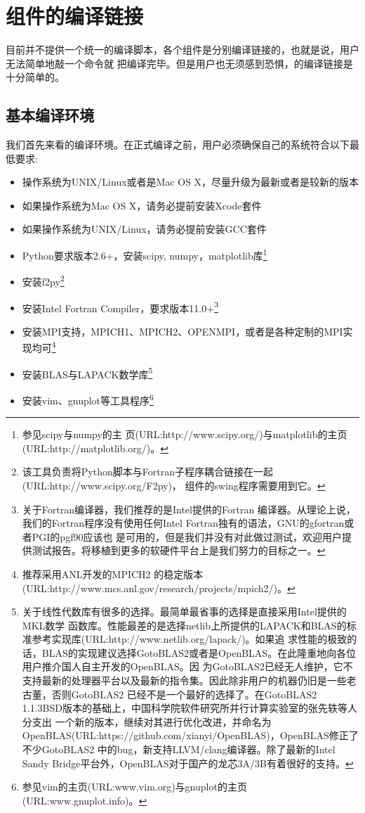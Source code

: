 \section{{\iqist}组件的编译链接}
\label{sec:compile}

{\iqist}目前并不提供一个统一的编译脚本，各个组件是分别编译链接的，也就是说，用户无法简单地敲一个命令就
把{\iqist}编译完毕。但是用户也无须感到恐惧，{\iqist}的编译链接是十分简单的。

\subsection{基本编译环境}

我们首先来看{\iqist}的编译环境。在正式编译{\iqist}之前，用户必须确保自己的系统符合以下最低要求:
\begin{itemize}
\item 操作系统为UNIX/Linux或者是Mac OS X，尽量升级为最新或者是较新的版本
\item 如果操作系统为Mac OS X，请务必提前安装Xcode套件
\item 如果操作系统为UNIX/Linux，请务必提前安装GCC套件
\item Python要求版本2.6+，安装scipy, numpy，matplotlib库\footnote{参见scipy与numpy的主
页(URL:http://www.scipy.org/)与matplotlib的主页(URL:http://matplotlib.org/)。}
\item 安装f2py\footnote{该工具负责将Python脚本与Fortran子程序耦合链接在一起(URL:http://www.scipy.org/F2py)，
{\hibiscus}组件的swing程序需要用到它。}
\item 安装Intel Fortran Compiler，要求版本11.0+\footnote{关于Fortran编译器，我们推荐的是Intel提供的Fortran
编译器。从理论上说，我们的Fortran程序没有使用任何Intel Fortran独有的语法，GNU的gfortran或者PGI的pgf90应该也
是可用的，但是我们并没有对此做过测试，欢迎用户提供测试报告。将{\iqist}移植到更多的软硬件平台上是我们努力的目标之一。}
\item 安装MPI支持，MPICH1、MPICH2、OPENMPI，或者是各种定制的MPI实现均可\footnote{推荐采用ANL开发的MPICH2
的稳定版本(URL:http://www.mcs.anl.gov/research/projects/mpich2/)。}
\item 安装BLAS与LAPACK数学库\footnote{关于线性代数库有很多的选择。最简单最省事的选择是直接采用Intel提供的MKL数学
函数库。性能最差的是选择netlib上所提供的LAPACK和BLAS的标准参考实现库(URL:http://www.netlib.org/lapack/)。如果追
求性能的极致的话，BLAS的实现建议选择GotoBLAS2或者是OpenBLAS。在此隆重地向各位用户推介国人自主开发的OpenBLAS。因
为GotoBLAS2已经无人维护，它不支持最新的处理器平台以及最新的指令集。因此除非用户的机器仍旧是一些老古董，否则GotoBLAS2
已经不是一个最好的选择了。在GotoBLAS2 1.1.3BSD版本的基础上，中国科学院软件研究所并行计算实验室的张先轶等人分支出
一个新的版本，继续对其进行优化改进，并命名为OpenBLAS(URL:https://github.com/xianyi/OpenBLAS)，OpenBLAS修正了不少GotoBLAS2
中的bug，新支持LLVM/clang编译器。除了最新的Intel Sandy Bridge平台外，OpenBLAS对于国产的龙芯3A/3B有着很好的支持。}
\item 安装vim、gnuplot等工具程序\footnote{参见vim的主页(URL:www.vim.org)与gnuplot的主页(URL:www.gnuplot.info)。}
\end{itemize}

